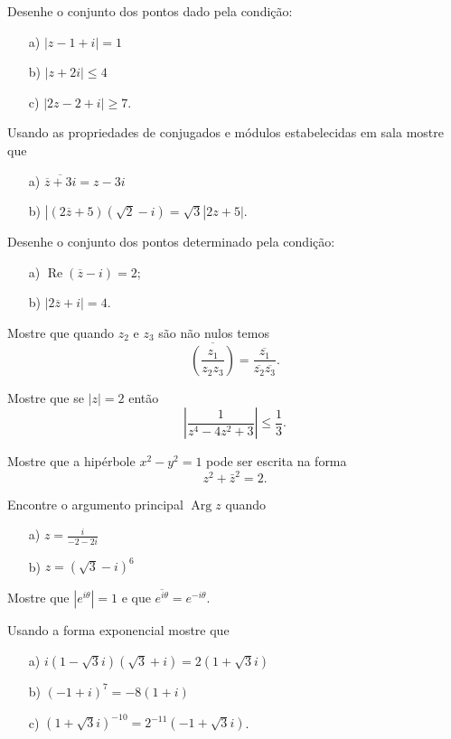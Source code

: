 \problem
Desenhe o conjunto dos pontos dado pela condi\c c\~ao:
\begin{itemize}
\item[a)] $|z-1+i| =1$
\item[b)] $|z+2i| \leq 4$
\item[c)] $|2z-2+i| \geq 7$.
\end{itemize}

\problem
Usando as propriedades de conjugados e m\'odulos estabelecidas em sala mostre que
\begin{itemize}
\item[a)] $\overline{\overline{z} +3i} = z-3i$
\item[b)] $|(2\overline{z} +5)(\sqrt{2}-i) = \sqrt{3} | 2z+5|$.
\end{itemize}

\problem
Desenhe o conjunto dos pontos determinado pela condi\c c\~ao:
\begin{itemize}
\item[a)] $\operatorname{Re}(\overline{z}-i) = 2$;
\item[b)] $|2\overline{z} +i| = 4$.
\end{itemize}

\problem
Mostre que quando $z_2$ e $z_3$ s\~ao n\~ao nulos temos
\[\overline{ \left( \frac{z_1}{z_2z_3} \right) } = \frac{\overline{z_1}}{\overline{z_2}\overline{z_3}}.\]

\problem
Mostre que se $|z|=2$ ent\~ao
\[\left|  \frac{1}{z^4-4z^2+3}  \right| \leq \frac{1}{3}.\]


\problem
Mostre que a hip\'erbole $x^2 - y^2 = 1$ pode ser escrita na forma
\[z^2+\bar{z}^2 =2.\]

\problem
Encontre o argumento principal $\operatorname{Arg} z$ quando
\begin{itemize}
\item[a)] $z= \frac{i}{-2-2i}$
\item[b)] $z= (\sqrt{3}-i)^6$
\end{itemize}


\problem
Mostre que $|e^{i\theta}| =1$ e que $\overline{e^{i\theta}} = e^{-i\theta}$.

\problem
Usando a forma exponencial mostre que
\begin{itemize}
\item[a)] $i(1-\sqrt{3}i)(\sqrt{3}+i)=2(1+\sqrt{3}i)$
\item[b)] $(-1+i)^7 = -8(1+i)$
\item[c)]$(1+\sqrt{3}i)^{-10} = 2^{-11}(-1+\sqrt{3}i)$.
\end{itemize}



